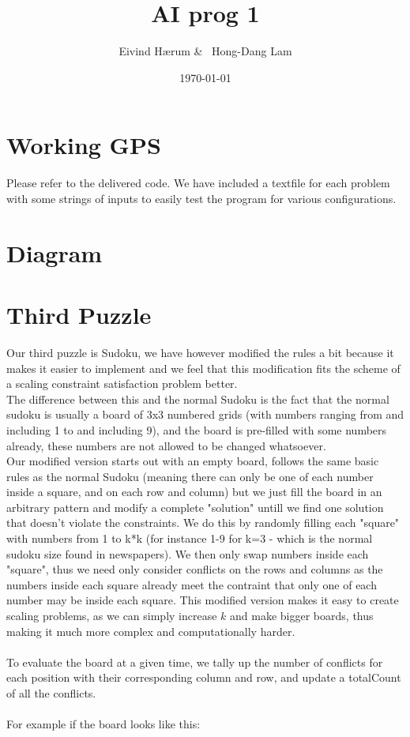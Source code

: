 \documentclass[12pt, a4paper]{article}
\title{AI prog 1}
\author{Eivind Hærum \& \ Hong-Dang Lam}
\date{\today} %
\begin{document}
\maketitle
% 
% 
 
\newpage
\tableofcontents
\newpage
 
\section{Working GPS}
Please refer to the delivered code.
We have included a textfile for each problem with some strings of inputs to easily test the program for various configurations.

\section{Diagram}

\section{Third Puzzle}
Our third puzzle is Sudoku, we have however modified the rules a bit because it makes it easier to implement and we feel that this modification fits the scheme of a scaling constraint satisfaction problem better.\\
The difference between this and the normal Sudoku is the fact that the normal sudoku is usually a board of 3x3 numbered grids (with numbers ranging from and including 1 to and including 9), and the board is pre-filled with some numbers already, these numbers are not allowed to be changed whatsoever.\\
Our modified version starts out with an empty board, follows the same basic rules as the normal Sudoku (meaning there can only be one of each number inside a square, and on each row and column) but we just fill the board in an arbitrary pattern and modify a complete "solution" untill we find one solution that doesn't violate the constraints. We do this by randomly filling each "square" with numbers from 1 to k*k (for instance 1-9 for k=3 - which is the normal sudoku size found in newspapers). We then only swap numbers inside each "square", thus we need only consider conflicts on the rows and columns as the numbers inside each square already meet the contraint that only one of each number may be inside each square. This modified version makes it easy to create scaling problems, as we can simply increase $k$ and make bigger boards, thus making it much more complex and computationally harder.
\\\\
To evaluate the board at a given time, we tally up the number of conflicts for each position with their corresponding column and row, and update a totalCount of all the conflicts.
\\\\
For example if the board looks like this:
\end{document}
